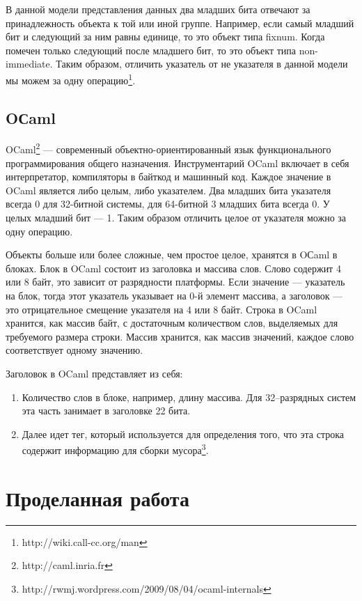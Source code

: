 В данной модели представления данных два младших бита отвечают за принадлежность объекта к той или иной 
группе. Например, если самый младший бит и следующий за ним равны единице, то это объект типа fixnum.
Когда помечен только следующий после младшего бит, то это объект типа non-immediate.
Таким образом, отличить указатель от не указателя в данной модели мы можем за одну 
операцию\footnote{http://wiki.call-cc.org/man}.

\subsection {OСaml}

OCaml\footnote{http://caml.inria.fr} --- современный объектно-ориентированный язык функционального программирования общего назначения. 
Инструментарий OCaml включает в себя интерпретатор, компиляторы в байткод и машинный код.
Каждое значение в OCaml является либо целым, либо указателем.
Два младших бита указателя всегда 0 для 32-битной системы, для 64-битной 3 младших бита всегда 0. У целых младший бит --- 1. 
Таким образом отличить целое от указателя можно за одну операцию.

Объекты больше или более сложные, чем простое целое, хранятся в OСaml в блоках.
Блок в OCaml состоит из заголовка и массива слов. Слово содержит 4 или 8 байт, это зависит от разрядности платформы.
Если значение --- указатель на блок, тогда этот указатель указывает на 0-й элемент массива, а
заголовок --- это отрицательное смещение указателя на 4 или 8 байт.
Строка в OCaml хранится, как массив байт,
с достаточным количеством слов, выделяемых для требуемого размера строки.
Массив хранится, как массив значений,
каждое слово соответствует одному значению.

Заголовок в OCaml представляет из себя:
\begin{enumerate}
\item Количество слов в блоке, например, длину массива. Для 32--разрядных систем эта часть занимает в заголовке 22 бита.
\item Далее идет тег, который используется для определения того, что эта строка содержит информацию для сборки мусора\footnote{http://rwmj.wordpress.com/2009/08/04/ocaml-internals}.
\end{enumerate}
 
\section {Проделанная работа}

